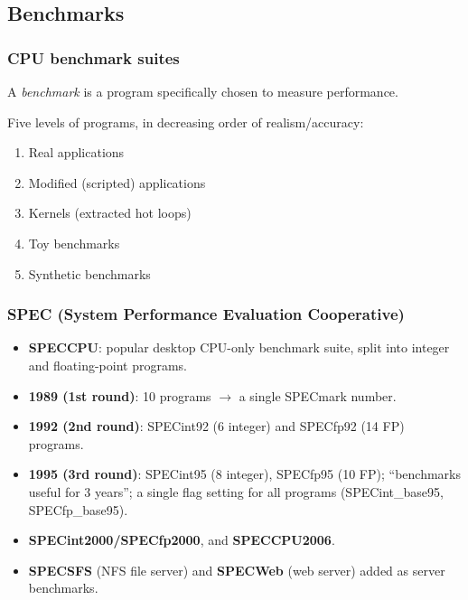 \subsection{Benchmarks}

\subsubsection{CPU benchmark suites}
\begin{definition}[Benchmark]
A \emph{benchmark} is a program specifically chosen to measure performance.
\end{definition}
Five levels of programs, in decreasing order of realism/accuracy:
\begin{enumerate}
  \item Real applications
  \item Modified (scripted) applications
  \item Kernels (extracted hot loops)
  \item Toy benchmarks
  \item Synthetic benchmarks
\end{enumerate}

\subsubsection{SPEC (System Performance Evaluation Cooperative)}
\begin{itemize}
  \item \textbf{SPECCPU}: popular desktop CPU-only benchmark suite, split
  into integer and floating-point programs.
  \item \textbf{1989 (1st round)}: 10 programs $\to$ a single SPECmark number.
  \item \textbf{1992 (2nd round)}: SPECint92 (6 integer) and SPECfp92 (14
  FP) programs.
  \item \textbf{1995 (3rd round)}: SPECint95 (8 integer), SPECfp95 (10 FP);
  ``benchmarks useful for 3 years''; a single flag setting for all programs
  (SPECint\_base95, SPECfp\_base95).
  \item \textbf{SPECint2000/SPECfp2000}, and \textbf{SPECCPU2006}.
  \item \textbf{SPECSFS} (NFS file server) and \textbf{SPECWeb} (web
  server) added as server benchmarks.
\end{itemize}

